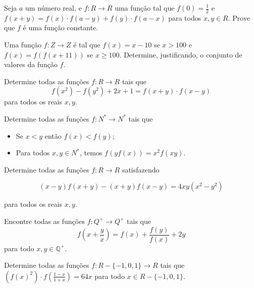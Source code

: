 \begin{questao}
  Seja $a$ um número real, e $f: R \rightarrow R$ uma função tal que
  $f(0)=\frac{1}{2}$ e $f(x+y) = f(x) \cdot f(a-y) + f(y) \cdot f(a-x)$ para
  todos $x,y \in R$. Prove que $f$ é uma função constante.
\end{questao}

\begin{questao}
  Uma função $f: Z \rightarrow Z$ é tal que $f(x)=x-10$ se $x>100$ e
  $f(x)=f(f(x+11))$ se $x \geq 100$. Determine, justificando, o conjunto de
  valores da função $f$.
\end{questao}

\begin{questao}
  Determine todas as funções $f: R \rightarrow R$ tais que
  $$ f(x^2) - f(y^2) +2x+1 = f(x+y) \cdot f(x-y) $$ para todos os reais $x,y$.
\end{questao}

\begin{questao}
  Determine todas as funções $f: N^{*} \rightarrow N^{*}$ tais que

  \begin{itemize}[itemsep=1ex, leftmargin=1cm]

  \item Se $x<y$ então $f(x) < f(y)$;

  \item Para todos $x,y \in N^{*}$, temos $f(yf(x)) = x^2 f(xy)$.

  \end{itemize}
\end{questao}

\begin{questao}
  Determine todas as funções $f: R \rightarrow R$ satisfazendo

  $$(x-y)f(x+y)-(x+y)f(x-y)=4xy(x^2-y^2)$$

  para todos os reais $x,y$.
\end{questao}

\begin{questao}
  Encontre todas as funções $f: Q^+ \rightarrow Q^+$ tais que
  $$f \left(x+\frac{y}{x} \right) = f(x) + \frac{f(y)}{f(x)}+2y$$ para todo $x,y
  \in \mathbb{Q^+}$.
\end{questao}

\begin{questao}
  Determine todas as funções $f: R-\{-1,0,1\} \rightarrow R$ tais que $(f(x)^2)
  \cdot f \left( \frac{1-x}{1+x} \right) = 64x$ para todo $x \in R-\{-1,0,1\}$.
\end{questao}

